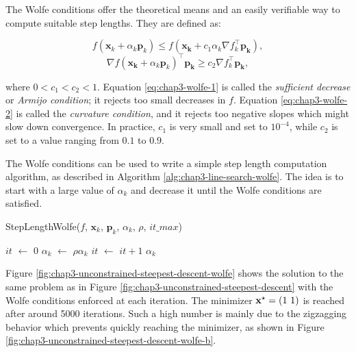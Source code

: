 The Wolfe conditions offer the theoretical means and an easily
verifiable way to compute suitable step lengths. They are defined as:

\begin{equation}
\label{eq:chap3-wolfe-1}
f(\mathbf{x}_k + \alpha_k\mathbf{p}_k) \le
f(\mathbf{x_k}+c_1\alpha_k\nabla f_k^{\top}\mathbf{p_k}),
\end{equation}
\begin{equation}
\label{eq:chap3-wolfe-2}
\nabla f(\mathbf{x_k} + \alpha_k
\mathbf{p}_k)^{\top}\mathbf{p_k} \ge c_2 \nabla f_k^{\top}\mathbf{p_k},
\end{equation}

where $0 < c_1 < c_2 < 1$. Equation \ref{eq:chap3-wolfe-1} is called
the \emph{sufficient decrease} or \emph {Armijo condition}; it rejects
too small decreases in $f$. Equation \ref{eq:chap3-wolfe-2} is called
the \emph{curvature condition}, and it rejects too negative slopes
which might slow down convergence. In practice, $c_1$ is very small
and set to $10^{-4}$, while $c_2$ is set to a value ranging from $0.1$
to $0.9$.

The Wolfe conditions can be used to write a simple step length
computation algorithm, as described in Algorithm
\ref{alg:chap3-line-search-wolfe}. The idea is to start with a large
value of $\alpha_k$ and decrease it until the Wolfe conditions are
satisfied.

\begin{algorithm}
\caption{StepLengthWolfe($f$, $\mathbf{x}_k$, $\mathbf{p}_k$,
  $\alpha_k$, $\rho$, $it\_max$)}
\label{alg:chap3-line-search-wolfe}
\begin{algorithmic}
\STATE $it$ $\leftarrow$ $0$
\STATE $\alpha_k$ $\leftarrow$ $\rho \alpha_k$ 
\STATE $it$ $\leftarrow$ $it + 1$
\ENDWHILE
\RETURN $\alpha_k$
\end{algorithmic}
\end{algorithm}

Figure \ref{fig:chap3-unconstrained-steepest-descent-wolfe} shows the
solution to the same problem as in Figure
\ref{fig:chap3-unconstrained-steepest-descent} with the Wolfe
conditions enforced at each iteration. The minimizer
$\mathbf{x}^{\star}=(1~1)$ is reached after around 5000 iterations. Such a
high number is mainly due to the zigzagging behavior which prevents
quickly reaching the minimizer, as shown in Figure
\ref{fig:chap3-unconstrained-steepest-descent-wolfe-b}.

